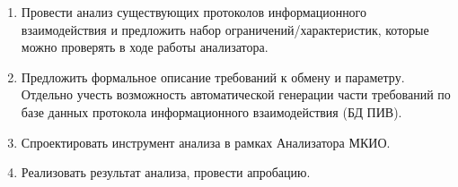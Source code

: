 \begin{enumerate}
 \item Провести анализ существующих протоколов информационного 
взаимодействия и предложить набор ограничений/характеристик, которые можно 
проверять в ходе работы анализатора.
 \item Предложить формальное описание требований к обмену и параметру. Отдельно 
учесть возможность автоматической генерации части требований по базе данных 
протокола информационного взаимодействия (БД ПИВ).
 \item Спроектировать инструмент анализа в рамках Анализатора МКИО.
 \item Реализовать результат анализа, провести апробацию.
\end{enumerate}
